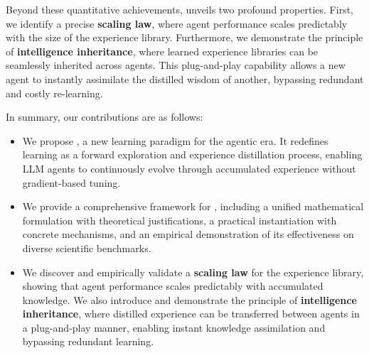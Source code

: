 Beyond these quantitative achievements, \method{} unveils two profound properties. First, we identify a precise \textbf{scaling law}, where agent performance scales predictably with the size of the experience library. Furthermore, we demonstrate the principle of \textbf{intelligence inheritance}, where learned experience libraries can be seamlessly inherited across agents. This plug-and-play capability allows a new agent to instantly assimilate the distilled wisdom of another, bypassing redundant and costly re-learning.

In summary, our contributions are as follows:
\begin{itemize}
\item We propose \textbf{\method{}}, a new learning paradigm for the agentic era. It redefines learning as a forward exploration and experience distillation process, enabling LLM agents to continuously evolve through accumulated experience without gradient-based tuning.
\item We provide a comprehensive framework for \method{}, including a unified mathematical formulation with theoretical justifications, a practical instantiation with concrete mechanisms, and an empirical demonstration of its effectiveness on diverse scientific benchmarks.
\item We discover and empirically validate a \textbf{scaling law} for the experience library, showing that agent performance scales predictably with accumulated knowledge. %
We also introduce and demonstrate the principle of \textbf{intelligence inheritance}, where distilled experience can be transferred between agents in a plug-and-play manner, enabling instant knowledge assimilation and bypassing redundant learning.
\end{itemize}